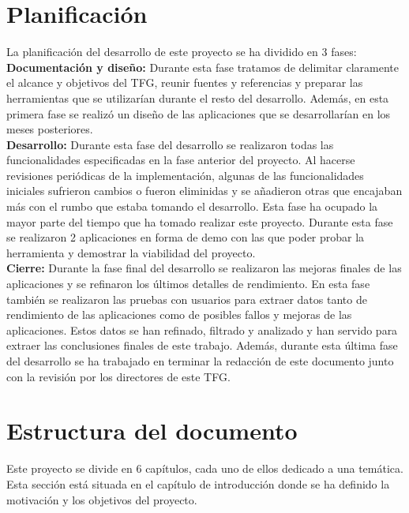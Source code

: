 \section{Planificaci\'on}

La planificaci\'on del desarrollo de este proyecto se ha dividido en 3 fases:\\


\textbf{Documentaci\'on y dise\~no:} Durante esta fase tratamos de delimitar claramente el alcance y objetivos del TFG, reunir fuentes y referencias y preparar las herramientas que se utilizar\'ian durante el resto del desarrollo. Adem\'as, en esta primera fase se realiz\'o un dise\~no de las aplicaciones que se desarrollar\'ian en los meses posteriores.\\

\textbf{Desarrollo:} Durante esta fase del desarrollo se realizaron todas las funcionalidades especificadas en la fase anterior del proyecto. Al hacerse revisiones peri\'odicas de la implementaci\'on, algunas de las funcionalidades iniciales sufrieron cambios o fueron eliminidas y se a\~nadieron otras que encajaban m\'as con el rumbo que estaba tomando el desarrollo. 
Esta fase ha ocupado la mayor parte del tiempo que ha tomado realizar este proyecto. Durante esta fase se realizaron 2 aplicaciones en forma de demo con las que poder probar la herramienta y demostrar la viabilidad del proyecto.\\

\textbf{Cierre:} Durante la fase final del desarrollo se realizaron las mejoras finales de las aplicaciones y se refinaron los \'ultimos detalles de rendimiento. En esta fase tambi\'en se realizaron las pruebas con usuarios para extraer datos tanto de rendimiento de las aplicaciones como de posibles fallos y mejoras de las aplicaciones. Estos datos se han refinado, filtrado y analizado y han servido para extraer las conclusiones finales de este trabajo. Adem\'as, durante esta \'ultima fase del desarrollo se ha trabajado en terminar la redacci\'on de este documento junto con la revisi\'on por los directores de este TFG. 

\section{Estructura del documento}

Este proyecto se divide en 6 cap\'itulos, cada uno de ellos dedicado a una tem\'atica. Esta secci\'on est\'a situada en el cap\'itulo de introducci\'on donde se ha definido la motivaci\'on y los objetivos del proyecto.\\

